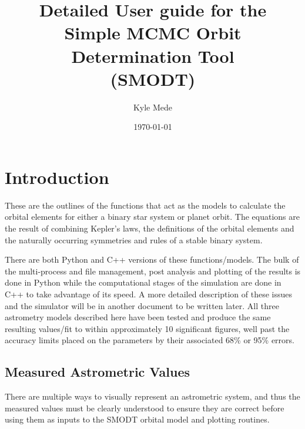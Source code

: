 \documentclass[12pt,preprint]{aastex}
\title{Detailed User guide for the \\ Simple MCMC Orbit Determination Tool \\(SMODT)}
\author{Kyle Mede}
\date{\today}
\begin{document}
\maketitle

\tableofcontents


\section{Introduction}

These are the outlines of the functions that act as the models to calculate the orbital elements for either a binary star system or planet orbit.  The equations are the result of combining Kepler's laws, the definitions of the orbital elements and the naturally occurring symmetries and rules of a stable binary system.

There are both Python and C++ versions of these functions/models.  The bulk of the multi-process and file management,  post analysis and plotting of the results is done in Python while the computational stages of the simulation are done in C++ to take advantage of its speed.  A more detailed description of these issues and the simulator will be in another document to be written later.  All three astrometry models described here have been tested and produce the same resulting values/fit to within approximately 10 significant figures, well past the accuracy limits placed on the parameters by their associated 68\% or 95\% errors.

%
\pagebreak
\subsection{Measured Astrometric Values}

There are multiple ways to visually represent an astrometric system, and thus the measured values must be clearly understood to ensure they are correct before using them as inputs to the SMODT orbital model and plotting routines.
\end{document}
